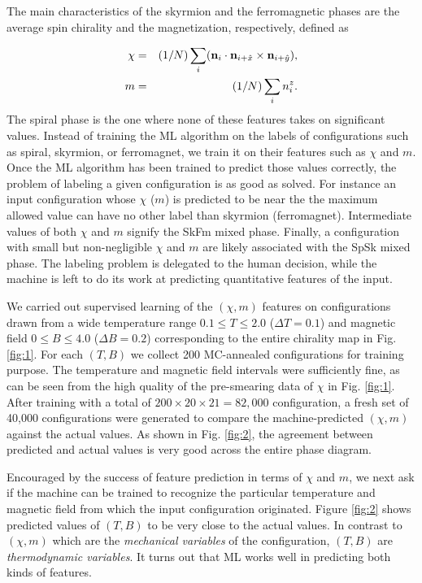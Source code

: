 \documentclass[reprint,amsmath,amssymb,aps,showpacs,superscriptaddress,prl]{revtex4-1}
\newcommand{\ba}{\begin{eqnarray}}
\newcommand{\ea}{\end{eqnarray}}
\renewcommand{\v}[1]{{\bf #1}}
\newcommand{\nn}{\nonumber \\}
\begin{document}
The main characteristics of the skyrmion and the ferromagnetic phases are the average spin chirality and the magnetization, respectively, defined as

\ba
\chi & = & (1/N) \sum_i  ( \v n_i \cdot \v n_{i+\hat{x}} \times \v n_{i+\hat{y}} ) , \nn
%
m &=& (1/N) \sum_i n_i^z .  \label{eq:m-and-chi} \ea
%
The spiral phase is the one where none of these features takes on significant values. Instead of training the ML algorithm on the labels of configurations such as spiral, skyrmion, or ferromagnet, we train it on their features such as $\chi$ and $m$. Once the ML algorithm has been trained to predict those values correctly, the problem of labeling a given configuration is as good as solved. For instance an input configuration whose $\chi$ ($m$)  is predicted to be near the the maximum allowed value can have no other label than skyrmion (ferromagnet). Intermediate values of both $\chi$ and $m$ signify the SkFm mixed phase. Finally, a configuration with small but non-negligible $\chi$ and $m$ are likely associated with the SpSk mixed phase. The labeling problem is delegated to the human decision, while the machine is left to do its work at predicting quantitative features of the input.

We carried out supervised learning of the $(\chi, m)$ features on configurations drawn from a wide temperature range $0.1 \le T \le 2.0$ ($\Delta T= 0.1$) and magnetic field $0 \le B \le 4.0$ ($\Delta B = 0.2$) corresponding to the entire chirality map in Fig. \ref{fig:1}. For each $(T,B)$ we collect 200 MC-annealed configurations for training purpose. The temperature and magnetic field intervals were sufficiently fine, as can be seen from the high quality of the pre-smearing data of $\chi$ in Fig. \ref{fig:1}. After training with a total of $200\times 20\times 21 = 82,000$ configuration, a fresh set of 40,000 configurations were generated to compare the machine-predicted $(\chi,m)$ against the actual values. As shown in Fig. \ref{fig:2}, the agreement between predicted and actual values is very good across the entire phase diagram.

Encouraged by the success of feature prediction in terms of $\chi$ and $m$, we next ask if the machine can be trained to recognize the particular temperature and magnetic field from which the input configuration originated. Figure \ref{fig:2} shows predicted values of $(T,B)$ to be very close to the actual values\cite{comment}. In contrast to $(\chi, m)$ which are the {\it mechanical variables} of the configuration, $(T,B)$ are {\it thermodynamic variables}. It turns out that ML
works well in predicting both kinds of features.
\end{document}
